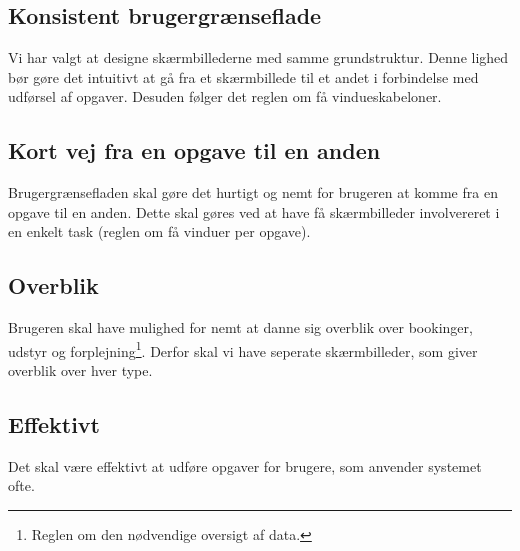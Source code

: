\subsection{Konsistent brugergrænseflade}
Vi har valgt at designe skærmbillederne med samme grundstruktur. Denne lighed bør gøre det intuitivt at gå fra et skærmbillede til et andet i forbindelse med udførsel af opgaver. Desuden følger det reglen om få vindueskabeloner.

\subsection{Kort vej fra en opgave til en anden}
Brugergrænsefladen skal gøre det hurtigt og nemt for brugeren at komme fra en opgave til en anden. Dette skal gøres ved at have få skærmbilleder involvereret i en enkelt task (reglen om få vinduer per opgave).

\subsection{Overblik}
Brugeren skal have mulighed for nemt at danne sig overblik over bookinger, udstyr og forplejning\footnote{Reglen om den nødvendige oversigt af data.}. Derfor skal vi have seperate skærmbilleder, som giver overblik over hver type.

\subsection{Effektivt}
Det skal være effektivt at udføre opgaver for brugere, som anvender systemet ofte.